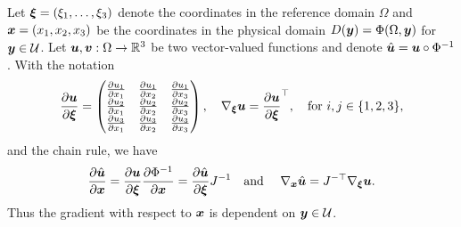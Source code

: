 Let $\bsxi  = (\xi_1,\ldots,\xi_3) $ denote the coordinates in the reference domain  $\Omega$ and $\bsx = (x_1,x_2,x_3)$ be the coordinates in the physical domain  $ D(\bsy) = \Phi(\Omega,\bsy)$ for $\bsy \in \calU$. Let $\bsu,\bsv: \Omega \to \R^3$ be two vector-valued functions and denote $\hat \bsu = \bsu \circ \Phi^{-1}$.
With the notation
\begin{align*}
    \DD{\bsu}{\bsxi} =    \begin{pmatrix}
         \DD{u_1}{x_1}& \DD{u_1}{x_2}& \DD{u_1}{x_3}  \\    
         \DD{ u_2}{x_1}& \DD{ u_2}{x_2}& \DD{u_2}{x_3}\\  
         \DD{ u_3}{x_1}& \DD{u_3}{x_2}& \DD{ u_3}{x_3}
    \end{pmatrix}, \quad \nabla_{\bsxi} \bsu = \DD{ \bsu}{\bsxi} ^{\top}, \quad \text{for } i,j \in \{1,2,3\},
\end{align*}
and the chain rule, we have
 \begin{align}\label{eq:partialderivativesinX}
\DD{\hat \bsu}{\bsx} =  \DD{\bsu}{\bsxi} \DD{\Phi^{-1}}{\bsx} =  \DD{\hat \bsu}{\bsxi} J^{-1} \quad \text{and } \quad  \nabla_{\bsx} \hat \bsu = J^{-\top} \nabla_{\bsxi} \bsu.
\end{align} Thus the gradient with respect to $\bsx$ is dependent on $\bsy \in \calU$.


